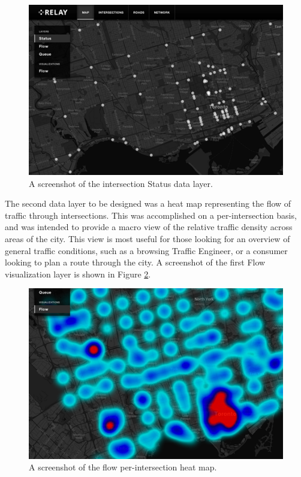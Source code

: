 \documentclass{report}
\begin{document}
\begin{figure}[htbp!]
  \begin{centering}
    \includegraphics[scale=0.9]{figures/status.png}
    \caption{A screenshot of the intersection Status data layer.}
    \label{fig:status}
  \end{centering}
\end{figure}

The second data layer to be designed was a heat map representing the flow of traffic through intersections.
This was accomplished on a per-intersection basis, and was intended to provide a macro view of the relative traffic density across areas of the city.
This view is most useful for those looking for an overview of general traffic conditions, such as a browsing Traffic Engineer, or a consumer looking to plan a route through the city.
A screenshot of the first Flow visualization layer is shown in Figure \ref{fig:flow-1}.

\begin{figure}[htbp!]
  \begin{centering}
    \includegraphics[scale=0.9]{figures/flow-1.png}
    \caption{A screenshot of the flow per-intersection heat map.}
    \label{fig:flow-1}
  \end{centering}
\end{figure}
\end{document}
